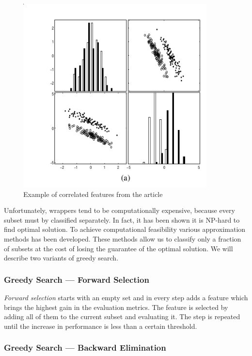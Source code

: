 \begin{figure}[ht]\centering
\includegraphics[width=100mm]{../img/guyeli_figure3.png}
\caption{Example of correlated features from the article}
\label{guyeli03-figure3}
\end{figure}

Unfortunately, wrappers tend to be computationally expensive, because every subset must by classified separately. In fact, it has been shown it is NP-hard to find optimal solution. To achieve computational feasibility various approximation methods has been developed. These methods allow us to classify only a fraction of subsets at the cost of losing the guarantee of the optimal solution. We will describe two variants of greedy search.


\subsubsection{Greedy Search --- Forward Selection}

{\it Forward selection} starts with an empty set and in every step adds a feature which brings the highest gain in the evaluation metrics. The feature is selected by adding all of them to the current  subset and evaluating it. The step is repeated until the increase in performance is less than a certain threshold. 

\subsubsection{Greedy Search --- Backward Elimination}

